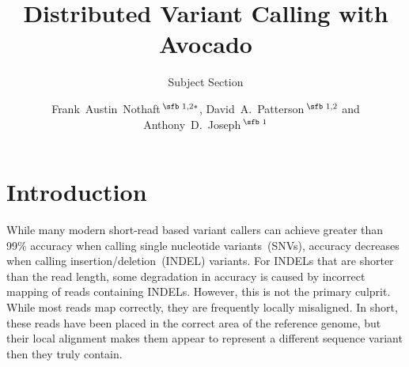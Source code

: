 \documentclass{bioinfo}
\begin{document}

\subtitle{Subject Section}

\title[Distributed Variant Calling with Avocado]{Distributed Variant Calling with Avocado}
\author[Nothaft \textit{et~al}.]{Frank~Austin~Nothaft\,$^{\text{\sfb 1,2}*}$, David~A.~Patterson\,$^{\text{\sfb 1,2}}$ and Anthony~D.~Joseph\,$^{\text{\sfb 1}}$}
\address{$^{\text{\sf 1}}$AMPLab, University of California, Berkeley, 94720, USA and \\
$^{\text{\sf 2}}$ASPIRE Lab, University of California, Berkeley, 94720, USA.}





\maketitle

\section{Introduction}

While many modern short-read based variant callers can achieve greater than
99\% accuracy when calling single nucleotide variants~(SNVs), accuracy decreases
when calling insertion/deletion~(INDEL) variants. For INDELs that are shorter
than the read length, some degradation in accuracy is caused by incorrect
mapping of reads containing INDELs. However, this is not the primary culprit.
While most reads map correctly, they
are frequently locally misaligned. In short, these reads have been placed in
the correct area of the reference genome, but their local alignment makes them
appear to represent a different sequence variant then they truly contain.
\end{document}
